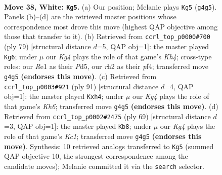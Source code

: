\documentclass[11pt]{article}
\begin{document}
\clearpage

\begin{figure}[p]\centering
\begin{subfigure}{0.46\textwidth}\centering
\resizebox{\linewidth}{!}{%
\newchessgame
\chessboard[
  setfen={8/6k1/8/8/p5K1/P7/7r/4R3 w - - 0 38},
  showmover=false,
  pgfstyle=straightmove, color=movearrow, markmove={g4-g5}
]}
\caption{}
\end{subfigure}\hfill
\begin{subfigure}{0.46\textwidth}\centering
\resizebox{\linewidth}{!}{%
\newchessgame
\chessboard[
  setfen={8/8/8/3p3k/p4P2/P7/5K2/8 b - - 1 40},
  showmover=false,
  pgfstyle=straightmove, color=movearrow, markmove={h5-g6}
]}
\caption{}
\end{subfigure}
\\[4pt]
\begin{subfigure}{0.46\textwidth}\centering
\resizebox{\linewidth}{!}{%
\newchessgame
\chessboard[
  setfen={8/r7/4R3/7p/7P/7k/5K2/8 b - - 2 46},
  showmover=false,
  pgfstyle=straightmove, color=movearrow, markmove={h3-h4}
]}
\caption{}
\end{subfigure}\hfill
\begin{subfigure}{0.46\textwidth}\centering
\resizebox{\linewidth}{!}{%
\newchessgame
\chessboard[
  setfen={2k5/6R1/2p5/p1P5/8/8/7r/1K6 b - - 0 35},
  showmover=false,
  pgfstyle=straightmove, color=movearrow, markmove={c8-b8}
]}
\caption{}
\end{subfigure}
\caption{\textbf{Move 38, White: \texttt{Kg5}.} (a) Our position; Melanie plays \texttt{Kg5} (\texttt{g4g5}). Panels (b)--(d) are the retrieved master positions whose correspondence most drove this move (highest QAP objective among those that transfer to it). (b) Retrieved from \texttt{ccrl\_top\_p0000\#700} (ply 79) [structural distance $d$=5, QAP obj=1]: the master played \texttt{Kg6}; under $\mu$ our \emph{Kg4} plays the role of that game's \emph{Kh4}; cross-type roles: our \emph{R}e1 as their \emph{P}d5, our \emph{r}h2 as their \emph{p}f4; transferred move \texttt{g4g5} \textbf{(endorses this move)}. (c) Retrieved from \texttt{ccrl\_top\_p0003\#921} (ply 91) [structural distance $d$=4, QAP obj=1]: the master played \texttt{Kxh4}; under $\mu$ our \emph{Kg4} plays the role of that game's \emph{Kh6}; transferred move \texttt{g4g5} \textbf{(endorses this move)}. (d) Retrieved from \texttt{ccrl\_top\_p0002\#2475} (ply 69) [structural distance $d$=3, QAP obj=1]: the master played \texttt{Kb8}; under $\mu$ our \emph{Kg4} plays the role of that game's \emph{Kc1}; transferred move \texttt{g4g5} \textbf{(endorses this move)}. Synthesis: 10 retrieved analogs transferred to \texttt{Kg5} (summed QAP objective 10, the strongest correspondence among the candidate moves); Melanie committed it via the \texttt{search} selector.}
\label{fig:thought-m74}
\end{figure}
\end{document}
